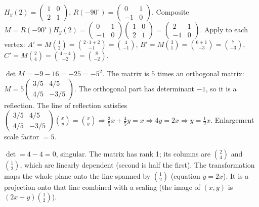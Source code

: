 \documentclass[11pt]{article}
\begin{document}
\begin{corrige}[Exercise 2]
$H_y(2) = \begin{pmatrix} 1 & 0 \\ 2 & 1 \end{pmatrix}$, $R(-90^\circ) = \begin{pmatrix} 0 & 1 \\ -1 & 0 \end{pmatrix}$.
Composite $M = R(-90^\circ) H_y(2) = \begin{pmatrix} 0 & 1 \\ -1 & 0 \end{pmatrix}\begin{pmatrix} 1 & 0 \\ 2 & 1 \end{pmatrix} = \begin{pmatrix} 2 & 1 \\ -1 & 0 \end{pmatrix}$.
Apply to each vertex:
$A' = M\binom{1}{2} = \binom{2\cdot1+2}{-1} = \binom{4}{-1}$,
$B' = M\binom{3}{1} = \binom{6+1}{-3} = \binom{7}{-3}$,
$C' = M\binom{2}{4} = \binom{4+4}{-2} = \binom{8}{-2}$.
\end{corrige}

\begin{corrige}[Exercise 3]
$\det M = -9 - 16 = -25 = -5^2$. The matrix is $5$ times an orthogonal matrix:
$M = 5 \begin{pmatrix} 3/5 & 4/5 \\ 4/5 & -3/5 \end{pmatrix}$.
The orthogonal part has determinant $-1$, so it is a reflection.
The line of reflection satisfies $\begin{pmatrix} 3/5 & 4/5 \\ 4/5 & -3/5 \end{pmatrix}\binom{x}{y} = \binom{x}{y} \Rightarrow \frac{3}{5}x + \frac{4}{5}y = x \Rightarrow 4y = 2x \Rightarrow y = \frac12 x$.
Enlargement scale factor $= 5$.
\end{corrige}

\begin{corrige}[Exercise 4]
$\det = 4 - 4 = 0$, singular. The matrix has rank 1; its columns are $\binom{2}{4}$ and $\binom{1}{2}$, which are linearly dependent (second is half the first). The transformation maps the whole plane onto the line spanned by $\binom{1}{2}$ (equation $y=2x$). It is a projection onto that line combined with a scaling (the image of $(x,y)$ is $(2x+y)\binom{1}{2}$).
\end{corrige}
\end{document}
